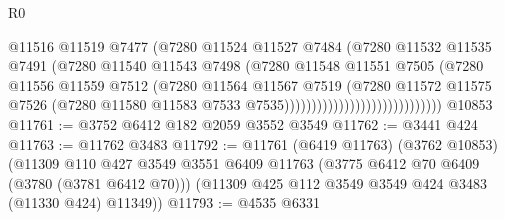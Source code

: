 \begin{lexlean}{R0}
\begin{coremodule}
                                              @11516
                                              @11519
                                              @7477
                                              (@7280
                                                @11524
                                                @11527
                                                @7484
                                                (@7280
                                                  @11532
                                                  @11535
                                                  @7491
                                                  (@7280
                                                    @11540
                                                    @11543
                                                    @7498
                                                    (@7280
                                                      @11548
                                                      @11551
                                                      @7505
                                                      (@7280
                                                        @11556
                                                        @11559
                                                        @7512
                                                        (@7280
                                                          @11564
                                                          @11567
                                                          @7519
                                                          (@7280
                                                            @11572
                                                            @11575
                                                            @7526
                                                            (@7280
                                                              @11580
                                                              @11583
                                                              @7533
                                                              @7535)))))))))))))))))))))))))))))
    @10853
@11761 := @3752 @6412 @182 @2059 @3552 @3549
@11762 := @3441 @424
@11763 := @11762 @3483
@11792 := @11761
    (@6419 @11763)
    (@3762 @10853)
    (@11309
      @110
      @427
      @3549
      @3551
      @6409
      @11763
      (@3775 @6412 @70 @6409 (@3780 (@3781 @6412 @70)))
      (@11309 @425 @112 @3549 @3549 @424 @3483 (@11330 @424) @11349))
@11793 := @4535 @6331

\end{coremodule}
\end{lexlean}
